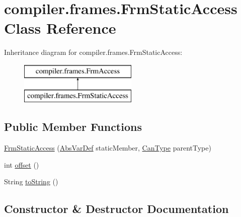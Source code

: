 \hypertarget{classcompiler_1_1frames_1_1_frm_static_access}{}\section{compiler.\+frames.\+Frm\+Static\+Access Class Reference}
\label{classcompiler_1_1frames_1_1_frm_static_access}
Inheritance diagram for compiler.\+frames.\+Frm\+Static\+Access\+:\begin{figure}[H]
\begin{center}
\leavevmode
\includegraphics[height=2.000000cm]{classcompiler_1_1frames_1_1_frm_static_access}
\end{center}
\end{figure}
\subsection*{Public Member Functions}
\begin{DoxyCompactItemize}
\item 
\hyperlink{classcompiler_1_1frames_1_1_frm_static_access_aa1e19f18731fd708e33c0d5dfae98724}{Frm\+Static\+Access} (\hyperlink{classcompiler_1_1abstr_1_1tree_1_1def_1_1_abs_var_def}{Abs\+Var\+Def} static\+Member, \hyperlink{classcompiler_1_1seman_1_1type_1_1_can_type}{Can\+Type} parent\+Type)
\item 
int \hyperlink{classcompiler_1_1frames_1_1_frm_static_access_aa25f7d44702e6e0242b7b894d30c7c08}{offset} ()
\item 
String \hyperlink{classcompiler_1_1frames_1_1_frm_static_access_a7e02d2e838ffec8979960f12e4938436}{to\+String} ()
\end{DoxyCompactItemize}


\subsection{Constructor \& Destructor Documentation}
\mbox{\label{classcompiler_1_1frames_1_1_frm_static_access_aa1e19f18731fd708e33c0d5dfae98724}} 
